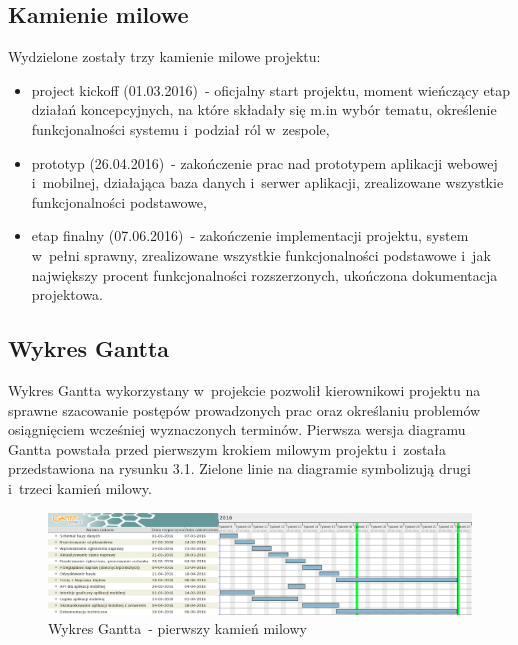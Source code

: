 \documentclass[a4paper,11pt]{article}
\begin{document}
\subsection{Kamienie milowe}
Wydzielone zostały trzy kamienie milowe projektu:
\begin{itemize}
	\item project kickoff (01.03.2016)~- oficjalny start projektu, moment wieńczący etap działań koncepcyjnych, na które składały się m.in wybór tematu, określenie funkcjonalności systemu i~podział ról w~zespole,
	\item prototyp (26.04.2016)~- zakończenie prac nad prototypem aplikacji webowej i~mobilnej, działająca baza danych i~serwer aplikacji, zrealizowane wszystkie funkcjonalności podstawowe,
	\item etap finalny (07.06.2016)~- zakończenie implementacji projektu, system w~pełni sprawny, zrealizowane wszystkie funkcjonalności podstawowe i~jak największy procent funkcjonalności rozszerzonych, ukończona dokumentacja projektowa.
\end{itemize}
\begin{landscape}
\subsection{Wykres Gantta}
Wykres Gantta wykorzystany w~projekcie pozwolił kierownikowi projektu na sprawne szacowanie postępów prowadzonych prac oraz określaniu problemów osiągnięciem wcześniej wyznaczonych terminów. Pierwsza wersja diagramu Gantta powstała przed pierwszym krokiem milowym projektu i~została przedstawiona na rysunku 3.1. Zielone linie na diagramie symbolizują drugi i~trzeci kamień milowy.

\begin{figure}[h!]
	\centering
	\includegraphics[width=1.3\textwidth,height=0.7\textheight]{gannth1.png}
	\caption{Wykres Gantta~- pierwszy kamień milowy}
\end{figure}
\end{landscape}
\end{document}
